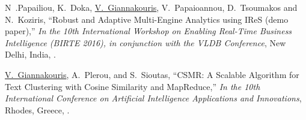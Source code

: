 \NumberedItem{[5]}
{N~.Papailiou, K.~Doka, \underline{V.~Giannakouris}, V.~Papaioannou, D.~Tsoumakos and N.~Koziris,
	``Robust and Adaptive Multi-Engine Analytics using IReS (demo paper),'' \textit{In the 10th International Workshop on Enabling Real-Time Business Intelligence (BIRTE 2016), in conjunction with the VLDB Conference},
	New Delhi, India,
	.}

\NumberedItem{[6]}
{\underline{V.~Giannakouris}, A.~Plerou, and S.~Sioutas, ``CSMR: A Scalable Algorithm for Text Clustering with Cosine Similarity and MapReduce,'' \textit{In the 10th International Conference on Artificial Intelligence Applications and Innovations}, Rhodes, Greece,
.}

\endgroup